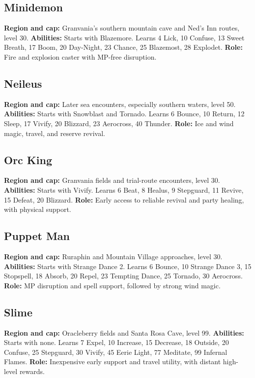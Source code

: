 \subsection{Minidemon}
\textbf{Region and cap:} Granvania's southern mountain cave and Ned's Inn routes, level 30.
\textbf{Abilities:} Starts with Blazemore. Learns 4 Lick, 10 Confuse,
13 Sweet Breath, 17 Boom, 20 Day-Night, 23 Chance, 25 Blazemost, 28 Explodet.
\textbf{Role:} Fire and explosion caster with MP-free disruption.

\subsection{Neileus}
\textbf{Region and cap:} Later sea encounters, especially southern waters, level 50.
\textbf{Abilities:} Starts with Snowblast and Tornado. Learns 6 Bounce,
10 Return, 12 Sleep, 17 Vivify, 20 Blizzard, 23 Aerocross, 40 Thunder.
\textbf{Role:} Ice and wind magic, travel, and reserve revival.

\subsection{Orc King}
\textbf{Region and cap:} Granvania fields and trial-route encounters, level 30.
\textbf{Abilities:} Starts with Vivify. Learns 6 Beat, 8 Healus,
9 Stepguard, 11 Revive, 15 Defeat, 20 Blizzard.
\textbf{Role:} Early access to reliable revival and party healing, with physical support.

\subsection{Puppet Man}
\textbf{Region and cap:} Ruraphin and Mountain Village approaches, level 30.
\textbf{Abilities:} Starts with Strange Dance 2. Learns 6 Bounce,
10 Strange Dance 3, 15 Stopspell, 18 Absorb, 20 Repel, 23 Tempting Dance,
25 Tornado, 30 Aerocross.
\textbf{Role:} MP disruption and spell support, followed by strong wind magic.

\subsection{Slime}
\textbf{Region and cap:} Oracleberry fields and Santa Rosa Cave, level 99.
\textbf{Abilities:} Starts with none. Learns 7 Expel, 10 Increase,
15 Decrease, 18 Outside, 20 Confuse, 25 Stepguard, 30 Vivify, 45 Eerie Light,
77 Meditate, 99 Infernal Flames.
\textbf{Role:} Inexpensive early support and travel utility, with distant high-level rewards.

